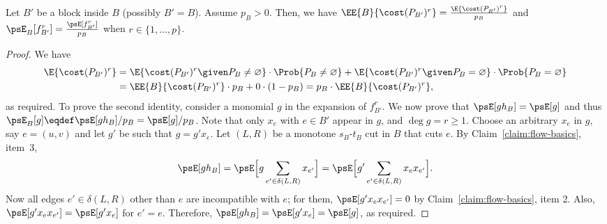 \documentclass[11pt,a4paper]{article}
\begin{document}
\begin{claim}\label{claim:conditional}
Let $B'$ be a block inside $B$ (possibly $B'= B$). Assume $p_B > 0$. Then, we have $\EE{B}{\cost(P_{B'})^r} = \frac{\E{\cost(P_{B'})^r}}{p_B}$ and 
$\psE_B[f_{B'}^r] = \frac{\psE[f_{B'}^r]}{p_B}$ when $r\in\{1,\dots,p\}$.
\end{claim}
\begin{proof}
We have
\begin{align*}
\E{\cost(P_{B'})^r} &= \E{\cost(P_{B'})^r\given P_B \neq \varnothing}\cdot \Prob{P_B \neq \varnothing} + \E{\cost(P_{B'})^r\given P_B = \varnothing}\cdot \Prob{P_B = \varnothing} \\
&= \EE{B}{\cost(P_{B'})^r} \cdot p_B + 0\cdot (1-p_B) = p_B \cdot \EE{B}{\cost(P_{B'})^r},
\end{align*}
as required. To prove the second identity, consider a monomial $g$ in the expansion of $f_{B'}^r$. We now prove that $\psE[gh_B] = \psE[g]$ and thus $\psE_B[g] \eqdef \psE[gh_B]/p_B = \psE[g] / p_B$.
Note that only $x_e$ with $e \in B'$ appear in $g$, and $\deg g = r \geq 1$. Choose an arbitrary $x_e$ in $g$, say $e=(u,v)$ and let \(g'\) be such that $g = g'x_e$. Let $(L,R)$ be a monotone $s_B$-$t_B$ cut in $B$ that cuts $e$. By Claim~\ref{claim:flow-basics}, item~3,
$$\psE[gh_B] = \psE\Bigl[g\sum_{e'\in\delta(L,R)} x_{e'}\Bigr] = \psE\Bigl[g'\sum_{e'\in\delta(L,R)} x_{e}x_{e'}\Bigr].$$
Now all edges $e'\in \delta(L,R)$ other than $e$ are incompatible with $e$; for them, $\psE[g'x_{e}x_{e'}] = 0$ by Claim~\ref{claim:flow-basics}, item 2. Also, $\psE[g'x_{e}x_{e'}] = \psE[g'x_{e}]$ for $e'=e$. Therefore, 
$\psE[gh_B] = \psE[g'x_{e}] = \psE[g]$,
as required.
\end{proof}
\end{document}
